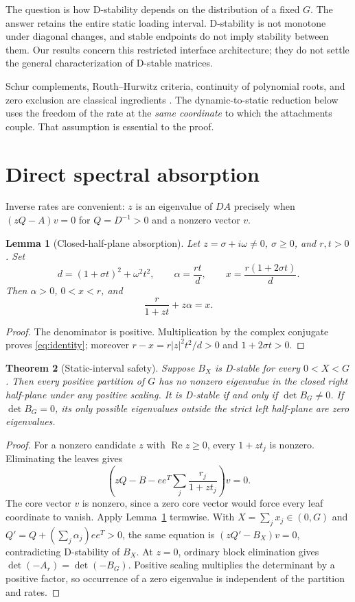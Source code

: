 \documentclass[11pt]{article}
\newtheorem{theorem}{Theorem}[section]
\newtheorem{lemma}[theorem]{Lemma}
\theoremstyle{remark}\newtheorem{remark}[theorem]{Remark}
\newcommand{\Rea}{\operatorname{Re}}\newcommand{\Ima}{\operatorname{Im}}
\begin{document}
The question is how D-stability depends on the distribution of a fixed $G$.
The answer retains the entire static loading interval. D-stability is not
monotone under diagonal changes, and stable endpoints do not imply stability
between them. Our results concern this restricted interface architecture;
they do not settle the general characterization of D-stable matrices.

Schur complements, Routh--Hurwitz criteria, continuity of polynomial roots,
and zero exclusion are classical ingredients \cite{barmish,cross}.
The dynamic-to-static reduction below uses the freedom of the rate at the
\emph{same coordinate} to which the attachments couple. That assumption is
essential to the proof.

\section{Direct spectral absorption}
Inverse rates are convenient: $z$ is an eigenvalue of $DA$ precisely when
$(zQ-A)v=0$ for $Q=D^{-1}>0$ and a nonzero vector $v$.

\begin{lemma}[Closed-half-plane absorption]\label{lem:absorb}
Let $z=\sigma+i\omega\ne0$, $\sigma\ge0$, and $r,t>0$. Set
\begin{equation}\label{eq:absorb}
 d=(1+\sigma t)^2+\omega^2t^2,\qquad
 \alpha=\frac{rt}{d},\qquad x=\frac{r(1+2\sigma t)}{d}.
\end{equation}
Then $\alpha>0$, $0<x<r$, and
\begin{equation}\label{eq:identity}
 \frac{r}{1+zt}+z\alpha=x.
\end{equation}
\end{lemma}
\begin{proof}
The denominator is positive. Multiplication by the complex conjugate proves
\eqref{eq:identity}; moreover
$r-x=r|z|^2t^2/d>0$ and $1+2\sigma t>0$.
\end{proof}

\begin{theorem}[Static-interval safety]\label{thm:safety}
Suppose $B_X$ is D-stable for every $0<X<G$. Then every positive partition
of $G$ has no nonzero eigenvalue in the closed right half-plane under any
positive scaling. It is D-stable if and only if $\det B_G\ne0$.
If $\det B_G=0$, its only possible eigenvalues outside the strict left
half-plane are zero eigenvalues.
\end{theorem}
\begin{proof}
For a nonzero candidate $z$ with $\Rea z\ge0$, every $1+zt_j$ is nonzero.
Eliminating the leaves gives
\[
 \left(zQ-B-ee^T\sum_j\frac{r_j}{1+zt_j}\right)v=0.
\]
The core vector $v$ is nonzero, since a zero core vector would force every
leaf coordinate to vanish. Apply Lemma~\ref{lem:absorb} termwise. With
$X=\sum_jx_j\in(0,G)$ and
$Q'=Q+(\sum_j\alpha_j)ee^T>0$, the same equation is
$(zQ'-B_X)v=0$, contradicting D-stability of $B_X$.
At $z=0$, ordinary block elimination gives
$\det(-A_r)=\det(-B_G)$. Positive scaling multiplies the determinant
by a positive factor, so occurrence of a zero eigenvalue is independent
of the partition and rates.
\end{proof}
\end{document}
